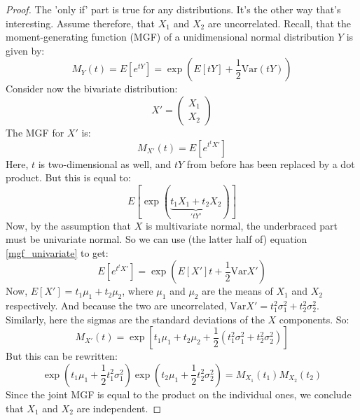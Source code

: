 \documentclass[12pt, a4paper]{article}
\numberwithin{equation}{section}
\begin{document}
\begin{proof}
The 'only if' part is true for any distributions. It's the other way that's interesting. Assume therefore, that $X_1$ and $X_2$ are uncorrelated. Recall, that the moment-generating function (MGF) of a unidimensional normal distribution $Y$ is given by:
\begin{equation}
\label{mgf_univariate}
M_Y(t)=E\left[e^{tY}\right]=\exp\left(E[tY]+\frac{1}{2}\textrm{Var}(tY)\right)
\end{equation}
Consider now the bivariate distribution:
\begin{equation}
X'=
\begin{pmatrix}
X_1 \\ X_2
\end{pmatrix}
\end{equation}
The MGF for $X'$ is:
\begin{equation}
M_{X'}(t)=E\left[e^{t^t X'}\right]
\end{equation}
Here, $t$ is two-dimensional as well, and $tY$ from before has been replaced by a dot product. But this is equal to:
\begin{equation}
E\left[\exp(\underbrace{t_1 X_1 + t_2 X_2}_{'tY'})\right]
\end{equation}
Now, by the assumption that $X$ is multivariate normal, the underbraced part must be univariate normal. So we can use (the latter half of) equation \ref{mgf_univariate} to get:
\begin{equation}
E\left[e^{t^t X'}\right]=\exp\left(E[X']t+\frac{1}{2}\textrm{Var}X'\right)
\end{equation}
Now, $E[X']=t_1\mu_1+t_2\mu_2$, where $\mu_1$ and $\mu_2$ are the means of $X_1$ and $X_2$ respectively. And because the two are uncorrelated, $\textrm{Var}X'=t_1^2\sigma_1^2+t_2^2\sigma_2^2$. Similarly, here the sigmas are the standard deviations of the $X$ components. So:
\begin{equation}
M_{X'}(t)=\exp\left[t_1\mu_1+t_2\mu_2+\frac{1}{2}\left(t_1^2\sigma_1^2+t_2^2\sigma_2^2\right)\right]
\end{equation}
But this can be rewritten:
\begin{equation}
\exp\left(t_1\mu_1+\frac{1}{2}t_1^2\sigma_1^2\right)\exp\left(t_2\mu_1+\frac{1}{2}t_2^2\sigma_2^2\right)=M_{X_1}(t_1)M_{X_2}(t_2)
\end{equation}
Since the joint MGF is equal to the product on the individual ones, we conclude that $X_1$ and $X_2$ are independent.
\end{proof}
\end{document}
